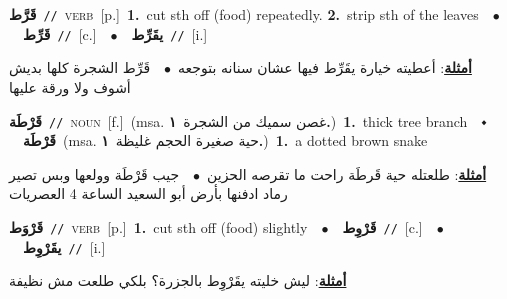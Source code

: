 \documentclass[10pt,a4paper,twoside]{article} %
\begin{document}
\begin{multicols}{2}
{\setlength\topsep{0pt}\textbf{\foreignlanguage{arabic}{قَرَّط}}\ {\color{gray}\texttt{//}\color{black}}\ \textsc{verb}\ [p.]\ \textbf{1.}~cut sth off (food) repeatedly.  \textbf{2.}~strip sth of the leaves\ \ $\bullet$\ \ \setlength\topsep{0pt}\textbf{\foreignlanguage{arabic}{قَرِّط}}\ {\color{gray}\texttt{//}\color{black}}\ [c.]\ \ $\bullet$\ \ \setlength\topsep{0pt}\textbf{\foreignlanguage{arabic}{يقَرِّط}}\ {\color{gray}\texttt{//}\color{black}}\ [i.]\  \begin{flushright}\color{gray}\foreignlanguage{arabic}{\textbf{\underline{\foreignlanguage{arabic}{أمثلة}}}: أعطيته خيارة يقَرِّط فيها عشان سنانه بتوجعه\ $\bullet$\ \  قَرِّط الشجرة كلها بديش أشوف ولا ورقة عليها}\end{flushright}\color{black}} \vspace{2mm}

{\setlength\topsep{0pt}\textbf{\foreignlanguage{arabic}{قَرْطَة}}\ {\color{gray}\texttt{//}\color{black}}\ \textsc{noun}\ [f.]\ \color{gray}(msa. \foreignlanguage{arabic}{غصن سميك من الشجرة}~\foreignlanguage{arabic}{\textbf{١.}})\color{black}\ \textbf{1.}~thick tree branch\ \ $\smblkdiamond$\ \ \setlength\topsep{0pt}\textbf{\foreignlanguage{arabic}{قَرْطَة}}\ \color{gray}(msa. \foreignlanguage{arabic}{حية صغيرة الحجم غليظة}~\foreignlanguage{arabic}{\textbf{١.}})\color{black}\ \textbf{1.}~a dotted brown snake\  \begin{flushright}\color{gray}\foreignlanguage{arabic}{\textbf{\underline{\foreignlanguage{arabic}{أمثلة}}}: طلعتله حية قَرطَة راحت ما تقرصه الحزين\ $\bullet$\ \  جيب قَرْطَة وولعها وبس تصير رماد ادفنها بأرض أبو السعيد الساعة 4 العصريات}\end{flushright}\color{black}} \vspace{2mm}

{\setlength\topsep{0pt}\textbf{\foreignlanguage{arabic}{قَرْوَط}}\ {\color{gray}\texttt{//}\color{black}}\ \textsc{verb}\ [p.]\ \textbf{1.}~cut sth off (food) slightly\ \ $\bullet$\ \ \setlength\topsep{0pt}\textbf{\foreignlanguage{arabic}{قَرْوِط}}\ {\color{gray}\texttt{//}\color{black}}\ [c.]\ \ $\bullet$\ \ \setlength\topsep{0pt}\textbf{\foreignlanguage{arabic}{يقَرْوِط}}\ {\color{gray}\texttt{//}\color{black}}\ [i.]\  \begin{flushright}\color{gray}\foreignlanguage{arabic}{\textbf{\underline{\foreignlanguage{arabic}{أمثلة}}}: ليش خليته يقَرْوِط بالجزرة؟ بلكي طلعت مش نظيفة}\end{flushright}\color{black}} \vspace{2mm}


\end{multicols}
\end{document}
